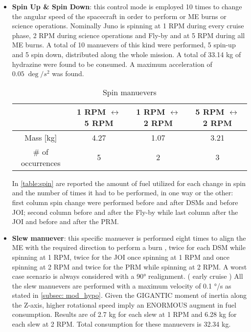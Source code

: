\begin{itemize}
    \item \textbf{Spin Up \& Spin Down}: this control mode is employed 10 times to change the angular speed of the spacecraft in order to perform or ME burns or science operations. Nominally Juno is spinning at 1 RPM during every cruise phase, 2 RPM during science operations and Fly-by and at 5 RPM during all ME burns. A total of 10 manuevers of this kind were performed, 5 spin-up and 5 spin down, distributed along the whole mission.  A total of 33.14 kg of hydrazine were found to be consumed. A maximum acceleration of $0.05 \; \deg /s^2$ was found. 
    
    \begin{table}[H]
        \renewcommand{\arraystretch}{1.3}
        \centering
        \begin{tabular}{|c|c|c|c|}
            \hline
            &\textbf{1 RPM $\leftrightarrow$ 5 RPM } & \textbf{1 RPM $\leftrightarrow$ 2 RPM } &\textbf{5 RPM $\leftrightarrow$ 2 RPM }\\
            \hline
            \hline
            Mass [kg] & 4.27 & 1.07 & 3.21 \\
            \hline
            \# of occurrences & 5 & 2 & 3 \\
            \hline
        \end{tabular}
        \caption{Spin manuevers}
        \label{table:spin}
    \end{table}

    In \autoref{table:spin} are reported the amount of fuel utilized for each change in spin and the number of times it had to be performed, in one way or the other: first column spin change were performed before and after DSMs and before JOI; second column before and after the Fly-by while last column after the JOI and before and after the PRM. 

    \item \textbf{Slew manuever}: this specific manuever is performed eight times to align the ME with the required direction to perform a burn \mref, twice for each DSM while spinning at 1 RPM, twice for the JOI once spinning at 1 RPM and once spinning at 2 RPM and twice for the PRM while spinning at 2 RPM. A worst case scenario is always considered with a 90° realignment. \mref ( early cruise )  
    All the slew manuevers are performed with a maximum velocity of 0.1 °/s as stated in \autoref{subsec: mod_hypo}. 
    Given the GIGANTIC moment of inertia along the Z-axis, higher rotational speed imply an ENORMOUS augment in fuel consumption. Results are of 2.7 kg for each slew at 1 RPM and 6.28 kg for each slew at 2 RPM.  Total consumption for these manuevers is 32.34 kg. 
    

\end{itemize}
